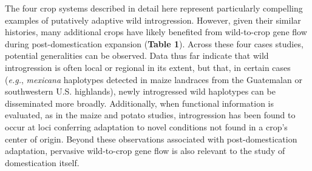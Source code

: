 \documentclass[11pt]{article}
\begin{document}
The four crop systems described in detail here represent particularly compelling examples of putatively adaptive wild introgression.
However, given their similar histories, many additional crops have likely benefited from wild-to-crop gene flow during post-domestication expansion (\textbf{Table 1}).
Across these four cases studies, potential generalities can be observed.
Data thus far indicate that wild introgression is often local or regional in its extent, but that, in certain cases (\emph{e.g.}, \emph{mexicana} haplotypes detected in maize landraces from the Guatemalan or southwestern U.S. highlands), newly introgressed wild haplotypes can be disseminated more broadly.
Additionally, when functional information is evaluated, as in the maize and potato studies, introgression has been found to occur at loci conferring adaptation to novel conditions not found in a crop's center of origin.
Beyond these observations associated with post-domestication adaptation, pervasive wild-to-crop gene flow is also relevant to the study of domestication itself.
\end{document}

